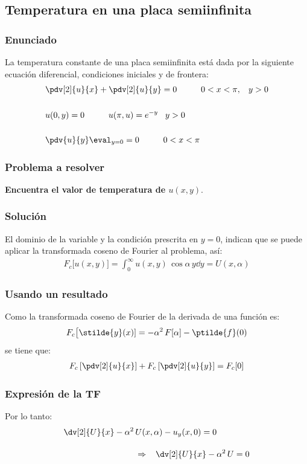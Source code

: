 \subsection{Temperatura en una placa semiinfinita}
\begin{frame}
\frametitle{Enunciado}
La temperatura constante de una placa semiinfinita está dada por la siguiente ecuación diferencial, condiciones iniciales y de frontera:
\begin{align*}
&\pdv[2]{u}{x} + \pdv[2]{u}{y} = 0 \hspace{1cm} 0 < x < \pi, \hspace{0.3cm} y > 0 \\[0.5cm]
&u(0, y) = 0 \hspace{1cm} u(\pi, u) = e^{-y} \hspace{0.3cm} y > 0 \\[0.5cm]
&\pdv{u}{y} \eval_{y=0} = 0 \hspace{1cm} 0 < x < \pi
\end{align*}
\end{frame}
\begin{frame}
\frametitle{Problema a resolver}
\textbf{Encuentra el valor de temperatura de $u(x,y)$}.
\end{frame}
\begin{frame}
\frametitle{Solución}
El dominio de la variable y la condición prescrita en $y = 0$, indican que se puede aplicar la transformada coseno de Fourier al problema, así:
\begin{align*}
F_{c} \big[u(x,y)\big] = \int_{0}^{\infty} u(x, y) \, \cos \alpha \, y \dd{y} = U(x, \alpha)
\end{align*}
\end{frame}
\begin{frame}
\frametitle{Usando un resultado}
Como la transformada coseno de Fourier de la derivada de una función es:
\begin{align*}
F_{c} \big[\stilde{y}(x)] = - \alpha^{2} \, F[\alpha] - \ptilde{f} (0)
\end{align*}
se tiene que:
\begin{align*}
F_{c} \left[\pdv[2]{u}{x} \right] + F_{c} \left[\pdv[2]{u}{y} \right] = F_{c} [0]
\end{align*}
\end{frame}
\begin{frame}
\frametitle{Expresión de la TF}
Por lo tanto:
\begin{align*}
\dv[2]{U}{x} - \alpha^{2} \, &U(x, \alpha) - u_{y} (x, 0) = 0 \\[1em]
&\Rightarrow \hspace{0.3cm} \dv[2]{U}{x} - \alpha^{2} \, U = 0
\end{align*}
\end{frame}
